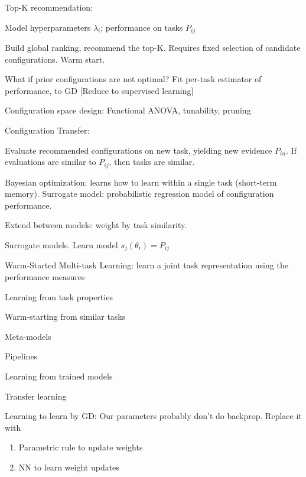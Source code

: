 \documentclass[english]{article}
\begin{document}
\benum 
\item Top-K recommendation:
\item Model hyperparameters $\lambda_i$; performance on tasks $P_{ij}$
\item Build global ranking, recommend the top-K. Requires fixed selection of candidate configurations. Warm start.

\item What if prior configurations are not optimal? Fit per-task estimator of performance, to GD [Reduce to supervised learning]

\item Configuration space design: Functional ANOVA, tunability, pruning

\item Configuration Transfer: 

Evaluate recommended configurations on new task, yielding new evidence $P_{in}$. If evaluations are similar to $P_{ij}$, then tasks are similar.

\item Bayesian optimization: learns how to learn within a single task (short-term memory). Surrogate model: probabilistic regression model of configuration performance. 

Extend between models: weight by task similarity. 

\item Surrogate models. Learn model $s_j(\theta_i)=P_{ij}$

\item Warm-Started Multi-task Learning: learn a joint task representation using the performance measures


\eenum

\item Learning from task properties

Warm-starting from similar tasks

Meta-models

Pipelines

\item Learning from trained models 

Transfer learning

Learning to learn by GD: Our parameters probably don't do backprop. Replace it with 
\begin{enumerate}
\item Parametric rule to update weights
\item NN to learn weight updates
\end{enumerate}
\end{document}
